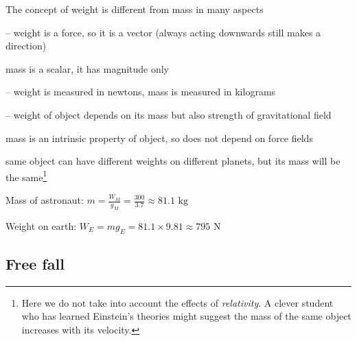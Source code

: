 The concept of weight is different from mass in many aspects

\begin{compactitem}
	\item[--] weight is a force, so it is a vector (always acting downwards still makes a direction)
	
	mass is a scalar, it has magnitude only
	
	\item[--] weight is measured in newtons, mass is measured in kilograms
	
	\item[--] weight of object depends on its mass but also strength of gravitational field
	
	mass is an intrinsic property of object, so does not depend on force fields
	
	same object can have different weights on different planets, but its mass will be the same\footnote{Here we do not take into account the effects of \emph{relativity}. A clever student who has learned Einstein's theories might suggest the mass of the same object increases with its velocity.}
\end{compactitem}


\begin{soln} Mass of astronaut: $m = \frac{W_M}{g_M} = \frac{300}{3.7} \approx 81.1 \text{ kg}$

Weight on earth: $W_E = mg_E = 81.1 \times 9.81 \approx 795 \text{ N}$ \end{soln}

\subsection*{Free fall}

